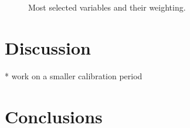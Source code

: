 \documentclass[draft]{agujournal2019}
\begin{document}
\begin{figure}[h]
	\noindent{}
	\caption{Most selected variables and their weighting.}
	\label{fig_variables_weights}
\end{figure}


\section{Discussion}
\label{discussion}



* work on a smaller calibration period

\section{Conclusions}
\label{conclusions}
\end{document}
